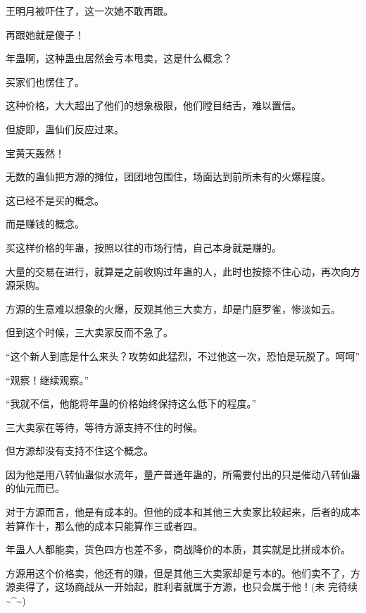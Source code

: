 \begin{this_body}
王明月被吓住了，这一次她不敢再跟。

再跟她就是傻子！

年蛊啊，这种蛊虫居然会亏本甩卖，这是什么概念？

买家们也愣住了。

这种价格，大大超出了他们的想象极限，他们瞠目结舌，难以置信。

但旋即，蛊仙们反应过来。

宝黄天轰然！

无数的蛊仙把方源的摊位，团团地包围住，场面达到前所未有的火爆程度。

这已经不是买的概念。

而是赚钱的概念。

买这样价格的年蛊，按照以往的市场行情，自己本身就是赚的。

大量的交易在进行，就算是之前收购过年蛊的人，此时也按捺不住心动，再次向方源采购。

方源的生意难以想象的火爆，反观其他三大卖方，却是门庭罗雀，惨淡如云。

但到这个时候，三大卖家反而不急了。

“这个新人到底是什么来头？攻势如此猛烈，不过他这一次，恐怕是玩脱了。呵呵”

“观察！继续观察。”

“我就不信，他能将年蛊的价格始终保持这么低下的程度。”

三大卖家在等待，等待方源支持不住的时候。

但方源却没有支持不住这个概念。

因为他是用八转仙蛊似水流年，量产普通年蛊的，所需要付出的只是催动八转仙蛊的仙元而已。

对于方源而言，他是有成本的。但他的成本和其他三大卖家比较起来，后者的成本若算作十，那么他的成本只能算作三或者四。

年蛊人人都能卖，货色四方也差不多，商战降价的本质，其实就是比拼成本价。

方源用这个价格卖，他还有的赚，但是其他三大卖家却是亏本的。他们卖不了，方源卖得了，这场商战从一开始起，胜利者就属于方源，也只会属于他！(未 完待续 \~{}\^{}\~{})

\end{this_body}

